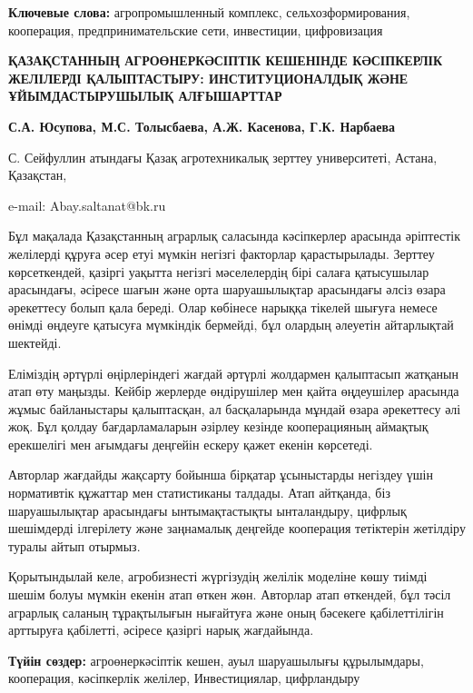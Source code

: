 {\bfseries Ключевые слова:} агропромышленный комплекс, сельхозформирования,
кооперация, предпринимательские сети, инвестиции, цифровизация

\begin{articleheader}
{\bfseries ҚАЗАҚСТАННЫҢ АГРОӨНЕРКӘСІПТІК КЕШЕНІНДЕ КӘСІПКЕРЛІК ЖЕЛІЛЕРДІ ҚАЛЫПТАСТЫРУ: ИНСТИТУЦИОНАЛДЫҚ ЖӘНЕ ҰЙЫМДАСТЫРУШЫЛЫҚ АЛҒЫШАРТТАР}

{\bfseries
С.А. Юсупова,
М.С. Толысбаева,
А.Ж. Касенова,
Г.К. Нарбаева
}
\end{articleheader}

\begin{affiliation}
С. Сейфуллин атындағы Қазақ агротехникалық зерттеу университеті, Астана, Қазақстан,

e-mail: Abay.saltanat@bk.ru
\end{affiliation}

Бұл мақалада Қазақстанның аграрлық саласында кәсіпкерлер арасында
әріптестік желілерді құруға әсер етуі мүмкін негізгі факторлар
қарастырылады. Зерттеу көрсеткендей, қазіргі уақытта негізгі
мәселелердің бірі салаға қатысушылар арасындағы, әсіресе шағын және орта
шаруашылықтар арасындағы әлсіз өзара әрекеттесу болып қала береді. Олар
көбінесе нарыққа тікелей шығуға немесе өнімді өңдеуге қатысуға мүмкіндік
бермейді, бұл олардың әлеуетін айтарлықтай шектейді.

Еліміздің әртүрлі өңірлеріндегі жағдай әртүрлі жолдармен қалыптасып
жатқанын атап өту маңызды. Кейбір жерлерде өндірушілер мен қайта
өңдеушілер арасында жұмыс байланыстары қалыптасқан, ал басқаларында
мұндай өзара әрекеттесу әлі жоқ. Бұл қолдау бағдарламаларын әзірлеу
кезінде кооперацияның аймақтық ерекшелігі мен ағымдағы деңгейін ескеру
қажет екенін көрсетеді.

Авторлар жағдайды жақсарту бойынша бірқатар ұсыныстарды негіздеу үшін
нормативтік құжаттар мен статистиканы талдады. Атап айтқанда, біз
шаруашылықтар арасындағы ынтымақтастықты ынталандыру, цифрлық шешімдерді
ілгерілету және заңнамалық деңгейде кооперация тетіктерін жетілдіру
туралы айтып отырмыз.

Қорытындылай келе, агробизнесті жүргізудің желілік моделіне көшу тиімді
шешім болуы мүмкін екенін атап өткен жөн. Авторлар атап өткендей, бұл
тәсіл аграрлық саланың тұрақтылығын нығайтуға және оның бәсекеге
қабілеттілігін арттыруға қабілетті, әсіресе қазіргі нарық жағдайында.

{\bfseries Түйін сөздер:} агроөнеркәсіптік кешен, ауыл шаруашылығы
құрылымдары, кооперация, кәсіпкерлік желілер, Инвестициялар, цифрландыру


